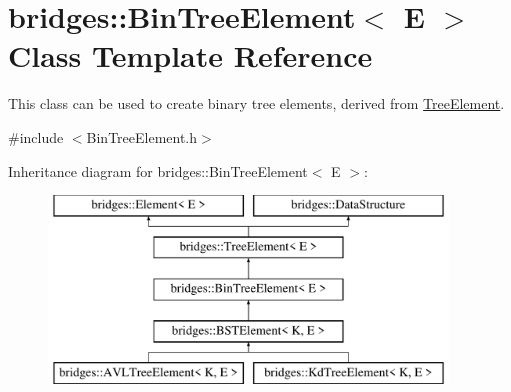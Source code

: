 \hypertarget{classbridges_1_1_bin_tree_element}{}\section{bridges\+:\+:Bin\+Tree\+Element$<$ E $>$ Class Template Reference}
\label{classbridges_1_1_bin_tree_element}


This class can be used to create binary tree elements, derived from \mbox{\hyperlink{classbridges_1_1_tree_element}{Tree\+Element}}.  




{\ttfamily \#include $<$Bin\+Tree\+Element.\+h$>$}

Inheritance diagram for bridges\+:\+:Bin\+Tree\+Element$<$ E $>$\+:\begin{figure}[H]
\begin{center}
\leavevmode
\includegraphics[height=5.000000cm]{classbridges_1_1_bin_tree_element}
\end{center}
\end{figure}
